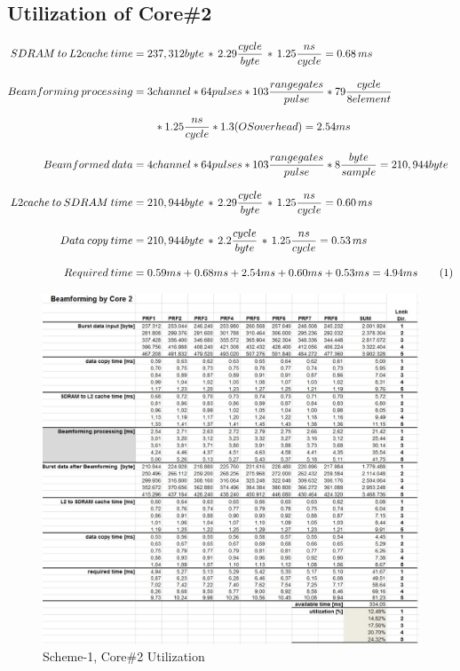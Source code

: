 \subsection{Utilization of Core\#2}
\begin{align*}
\label{aa:scheme1:core2:equ1}
	SDRAM \: to \: L2cache \: time &= 237,312 byte \, * \, 2.29\frac{cycle}{byte} \, * \, 1.25\frac{ns}{cycle} = 0.68 \, ms \\[0.3cm]
	Beamforming \: processing &= 3channel * 64pulses * 103 \frac{range gates}{pulse} * 79\frac{cycle}{8 element} \\[0.3cm] 
	&\qquad * 1.25\frac{ns}{cycle} * 1.3(OSoverhead) = 2.54ms\\[0.3cm]
	Beamformed \: data &= 4channel * 64pulses * 103 \frac{range gates}{pulse} *8\frac{byte}{sample} = 210,944byte \\[0.3cm]
	L2cache \: to \: SDRAM \: time &= 210,944 byte \, * \, 2.29\frac{cycle}{byte} \, * \, 1.25\frac{ns}{cycle} = 0.60 \, ms \\[0.3cm]
	Data \: copy \: time &= 210,944 byte \, * \, 2.2\frac{cycle}{byte} \, * \, 1.25\frac{ns}{cycle} = 0.53 \, ms \\[0.3cm]
	Required \: time &= 0.59ms + 0.68ms + 2.54ms + 0.60ms + 0.53ms = 4.94ms \stepcounter{equation}\tag{\theequation} 
\end{align*}
\begin{figure}[h!]
	\centering
	\includegraphics[width=150mm]{figures/aa_scheme1_cpu_util_2}
	\caption{Scheme-1, Core\#2 Utilization}
	\label{fig:existing_analysis:aa_scheme1_cpu_util2}
\end{figure}

